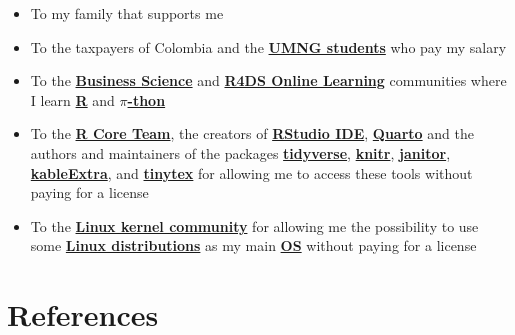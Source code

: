 \documentclass[
  ignorenonframetext,
]{beamer}
\begin{document}
\begin{frame}{}
\label{section-17}
\begin{itemize}
\item
  To my family that supports me
\item
  To the taxpayers of Colombia and the
  \href{https://www.umng.edu.co/estudiante}{\textbf{UMNG students}} who
  pay my salary
\item
  To the \href{https://www.business-science.io/}{\textbf{Business
  Science}} and \href{https://www.rfordatasci.com/}{\textbf{R4DS Online
  Learning}} communities where I learn
  \href{https://www.r-project.org/about.html}{\textbf{R}} and
  \href{https://www.python.org/about/}{\textbf{\(\pi\)-thon}}
\item
  To the \href{https://www.r-project.org/contributors.html}{\textbf{R
  Core Team}}, the creators of
  \href{https://rstudio.com/products/rstudio/}{\textbf{RStudio IDE}},
  \href{https://quarto.org/}{\textbf{Quarto}} and the authors and
  maintainers of the packages
  \href{https://CRAN.R-project.org/package=tidyverse}{\textbf{tidyverse}},
  \href{https://CRAN.R-project.org/package=knitr}{\textbf{knitr}},
  \href{https://CRAN.R-project.org/package=janitor}{\textbf{janitor}},
  \href{https://CRAN.R-project.org/package=kableExtra}{\textbf{kableExtra}},
  and
  \href{https://CRAN.R-project.org/package=tinytex}{\textbf{tinytex}}
  for allowing me to access these tools without paying for a license
\item
  To the \href{https://www.kernel.org/category/about.html}{\textbf{Linux
  kernel community}} for allowing me the possibility to use some
  \href{https://static.lwn.net/Distributions/}{\textbf{Linux
  distributions}} as my main
  \href{https://en.wikipedia.org/wiki/Operating_system}{\textbf{OS}}
  without paying for a license
\end{itemize}
\end{frame}

\section*{References}\label{references}
\end{document}
